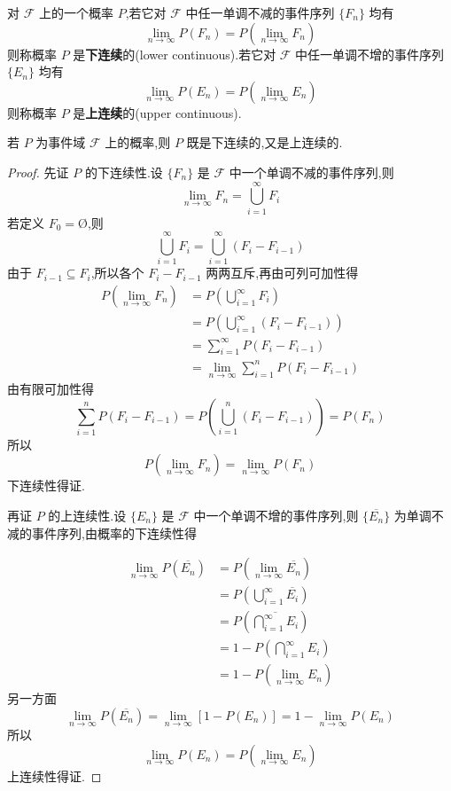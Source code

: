 \begin{definition}
    \indent 对 $\mathcal{F}$ 上的一个概率 $P$,若它对 $\mathcal{F}$ 中任一单调不减的事件序列 $\{F_n\}$ 均有
    $$
    \lim_{n \to \infty} P(F_n) = P(\lim_{n \to \infty} F_n)
    $$
    则称概率 $P$ 是\textbf{下连续}的(lower continuous).若它对 $\mathcal{F}$ 中任一单调不增的事件序列 $\{E_n\}$ 均有
    $$
    \lim_{n \to \infty} P(E_n) = P(\lim_{n \to \infty} E_n)
    $$
    则称概率 $P$ 是\textbf{上连续}的(upper continuous).
\end{definition}

\begin{property}
    \indent 若 $P$ 为事件域 $\mathcal{F}$ 上的概率,则 $P$ 既是下连续的,又是上连续的.
\end{property}

\begin{proof}
    先证 $P$ 的下连续性.设 $\{ F_n \}$ 是 $\mathcal{F}$ 中一个单调不减的事件序列,则
    $$
    \lim_{n \to \infty} F_n = \bigcup_{i=1}^{\infty} F_i
    $$
    若定义 $F_0 = \text{\O}$,则
    $$
    \bigcup_{i=1}^{\infty} F_i = \bigcup_{i=1}^{\infty} (F_i - F_{i-1})
    $$
    由于 $F_{i-1} \subseteq F_i$,所以各个 $F_i - F_{i-1}$ 两两互斥,再由可列可加性得
    $$
    \begin{aligned}
        P(\lim_{n \to \infty} F_n) &= P \left( \bigcup_{i=1}^{\infty} F_i \right) \\
        &= P \left( \bigcup_{i=1}^{\infty} (F_i - F_{i-1}) \right) \\
        &= \sum_{i=1}^{\infty} P(F_i - F_{i-1}) \\
        &= \lim_{n \to \infty} \sum_{i=1}^n P(F_i - F_{i-1})
    \end{aligned}
    $$
    由有限可加性得
    $$
    \sum_{i=1}^n P(F_i - F_{i-1}) = P \left( \bigcup_{i=1}^n (F_i - F_{i-1}) \right) = P(F_n)
    $$
    所以
    $$
    P(\lim_{n \to \infty} F_n) = \lim_{n \to \infty} P(F_n)
    $$
    下连续性得证.

    再证 $P$ 的上连续性.设 $\{ E_n \}$ 是 $\mathcal{F}$ 中一个单调不增的事件序列,则 $\{ \overline{E_n} \}$ 为单调不减的事件序列,由概率的下连续性得

    $$
    \begin{aligned}
        \lim_{n \to \infty} P(\overline{E_n}) &= P(\lim_{n \to \infty} \overline{E_n}) \\
        &= P \left( \bigcup_{i=1}^{\infty} \overline{E_i} \right) \\
        &= P \left(\overline{\bigcap_{i=1}^{\infty} E_i} \right) \\
        &= 1 - P \left(\bigcap_{i=1}^{\infty} E_i \right) \\
        &= 1 - P(\lim_{n \to \infty} E_n)
    \end{aligned}
    $$
    另一方面
    $$
    \lim_{n \to \infty} P(\overline{E_n}) = \lim_{n \to \infty} [1 - P(E_n)] = 1 - \lim_{n \to \infty} P(E_n)
    $$
    所以
    $$
    \lim_{n \to \infty} P(E_n) = P(\lim_{n \to \infty} E_n)
    $$
    上连续性得证.
\end{proof}

